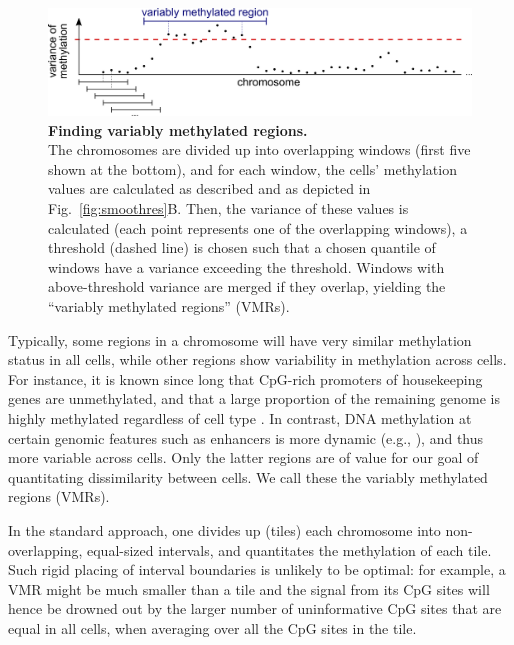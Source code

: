 \documentclass[twocolumn,10pt]{article}
\begin{document}
\begin{figure}
    \begin{center}
    \includegraphics[width=\columnwidth]{figures/Fig_sliding.png}
    \end{center}
    \caption{\small \textbf{Finding variably methylated regions.}\\
    The chromosomes are divided up into overlapping windows (first five shown at the bottom), and for each window, the cells' methylation values are calculated as described and as depicted in Fig.~\ref{fig:smoothres}B.
    Then, the variance of these values is calculated (each point represents one of the overlapping windows), a threshold (dashed line) is chosen such that a chosen quantile of windows have a variance exceeding the threshold.
    Windows with above-threshold variance are merged if they overlap, yielding the ``variably methylated regions'' (VMRs).}
    \label{fig:vmr}
\end{figure}


Typically, some regions in a chromosome will have very similar methylation status in all cells, while other regions show variability in methylation across cells.
For instance, it is known  since long that CpG-rich promoters of housekeeping genes are unmethylated, and that a large proportion of the remaining genome is highly methylated regardless of cell type \citep{bird1986cpg}.
In contrast, DNA methylation at certain genomic features such as enhancers is more dynamic (e.g., \citet{argelaguet2019gastru}), and thus more variable across cells.
Only the latter regions are of value for our goal of quantitating dissimilarity between cells.
We call these the variably methylated regions (VMRs). %

In the standard approach, one divides up (tiles) each chromosome into non-overlapping, equal-sized intervals, and quantitates the methylation of each tile.
Such rigid placing of interval boundaries is unlikely to be optimal: for example, a VMR might be much smaller than a tile and the signal from its CpG sites will hence be drowned out by the larger number of uninformative CpG sites that are equal in all cells, when averaging over all the CpG sites in the tile.
\end{document}

